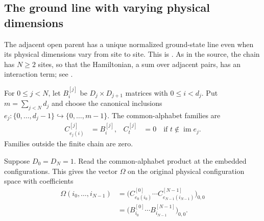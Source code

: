 \subsection{The ground line with varying physical dimensions}

The adjacent open parent has a unique normalized ground-state line even when
its physical dimensions vary from site to site. This is
\cite[Theorem~9]{PerezGarcia2007Matrix}. As in the source, the chain has
$N\ge2$ sites, so that the Hamiltonian, a sum over adjacent pairs, has an
interaction term; see \cite{gap:pgvwc07_open_parent_domain}.

\begin{definition}
    \label{def:varying_physical_actual_site_extension}
    \leanok
    For $0\le j<N$, let $B^{[j]}_i$ be $D_j\times D_{j+1}$ matrices with
    $0\le i<d_j$. Put $m=\sum_{j<N}d_j$ and choose the canonical inclusions
    $e_j:\{0,\ldots,d_j-1\}\hookrightarrow\{0,\ldots,m-1\}$.
    The common-alphabet families are
    \begin{align}
        C^{[j]}_{e_j(i)} & =B^{[j]}_i,                                   &
        C^{[j]}_t        & =0\quad\text{if }t\notin\operatorname{im}e_j.
    \end{align}
    Families outside the finite chain are zero.
\end{definition}

\begin{definition}
    \label{def:varying_physical_scalar_state}
    \leanok
    Suppose $D_0=D_N=1$. Read the common-alphabet product at the
    embedded configurations. This gives the vector $\Omega$ on the original
    physical configuration space with coefficients
    \begin{align}
        \Omega(i_0,\ldots,i_{N-1})
         & =\bigl(C^{[0]}_{e_0(i_0)}\cdots
        C^{[N-1]}_{e_{N-1}(i_{N-1})}\bigr)_{0,0}                       \\
         & =\bigl(B^{[0]}_{i_0}\cdots B^{[N-1]}_{i_{N-1}}\bigr)_{0,0}.
    \end{align}
\end{definition}


